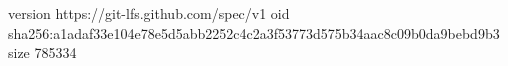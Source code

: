 version https://git-lfs.github.com/spec/v1
oid sha256:a1adaf33e104e78e5d5abb2252c4c2a3f53773d575b34aac8c09b0da9bebd9b3
size 785334
